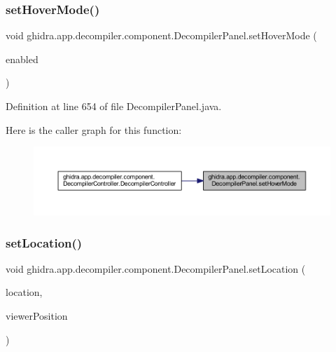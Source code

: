 \subsubsection{\texorpdfstring{setHoverMode()}{setHoverMode()}}
{\footnotesize\ttfamily void ghidra.\+app.\+decompiler.\+component.\+Decompiler\+Panel.\+set\+Hover\+Mode (\begin{DoxyParamCaption}\item[{boolean}]{enabled }\end{DoxyParamCaption})\hspace{0.3cm}{\ttfamily [inline]}}



Definition at line 654 of file Decompiler\+Panel.\+java.

Here is the caller graph for this function\+:
\nopagebreak
\begin{figure}[H]
\begin{center}
\leavevmode
\includegraphics[width=350pt]{classghidra_1_1app_1_1decompiler_1_1component_1_1_decompiler_panel_ad506e0f6404f530197c697471aad3594_icgraph}
\end{center}
\end{figure}
\mbox{\label{classghidra_1_1app_1_1decompiler_1_1component_1_1_decompiler_panel_aa7d5c96f468ed45383b4a6c1e52d57c0}} 
\subsubsection{\texorpdfstring{setLocation()}{setLocation()}}
{\footnotesize\ttfamily void ghidra.\+app.\+decompiler.\+component.\+Decompiler\+Panel.\+set\+Location (\begin{DoxyParamCaption}\item[{Program\+Location}]{location,  }\item[{Viewer\+Position}]{viewer\+Position }\end{DoxyParamCaption})\hspace{0.3cm}{\ttfamily [inline]}}



